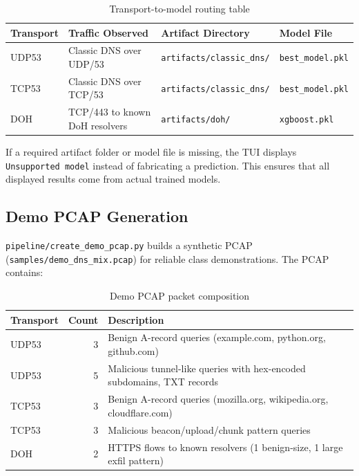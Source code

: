\documentclass[12pt,a4paper]{article}
\begin{document}
\begin{table}[H]
\centering
\begin{tabular}{@{}llll@{}}
\toprule
\textbf{Transport} & \textbf{Traffic Observed} & \textbf{Artifact Directory} & \textbf{Model File} \\
\midrule
UDP53  & Classic DNS over UDP/53          & \texttt{artifacts/classic\_dns/} & \texttt{best\_model.pkl} \\
TCP53  & Classic DNS over TCP/53          & \texttt{artifacts/classic\_dns/} & \texttt{best\_model.pkl} \\
DOH    & TCP/443 to known DoH resolvers   & \texttt{artifacts/doh/}          & \texttt{xgboost.pkl} \\
\bottomrule
\end{tabular}
\caption{Transport-to-model routing table}
\end{table}

If a required artifact folder or model file is missing, the TUI displays \texttt{Unsupported model} instead of fabricating a prediction. This ensures that all displayed results come from actual trained models.

\subsection{Demo PCAP Generation}

\texttt{pipeline/create\_demo\_pcap.py} builds a synthetic PCAP (\texttt{samples/demo\_dns\_mix.pcap}) for reliable class demonstrations. The PCAP contains:

\begin{table}[H]
\centering
\begin{tabular}{@{}lrl@{}}
\toprule
\textbf{Transport} & \textbf{Count} & \textbf{Description} \\
\midrule
UDP53 & 3  & Benign A-record queries (example.com, python.org, github.com) \\
UDP53 & 5  & Malicious tunnel-like queries with hex-encoded subdomains, TXT records \\
TCP53 & 3  & Benign A-record queries (mozilla.org, wikipedia.org, cloudflare.com) \\
TCP53 & 3  & Malicious beacon/upload/chunk pattern queries \\
DOH   & 2  & HTTPS flows to known resolvers (1 benign-size, 1 large exfil pattern) \\
\bottomrule
\end{tabular}
\caption{Demo PCAP packet composition}
\end{table}
\end{document}

